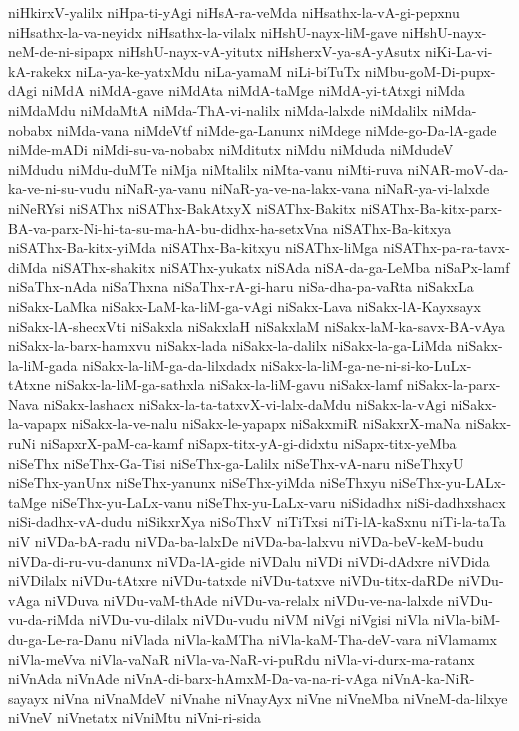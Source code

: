 {niHkirxV-yalilx
niHpa-ti-yAgi
niHsA-ra-veMda
niHsathx-la-vA-gi-pepxnu
niHsathx-la-va-neyidx
niHsathx-la-vilalx
niHshU-nayx-liM-gave
niHshU-nayx-neM-de-ni-sipapx
niHshU-nayx-vA-yitutx
niHsherxV-ya-sA-yAsutx
niKi-La-vi-kA-rakekx
niLa-ya-ke-yatxMdu
niLa-yamaM
niLi-biTuTx
niMbu-goM-Di-pupx-dAgi
niMdA
niMdA-gave
niMdAta
niMdA-taMge
niMdA-yi-tAtxgi
niMda
niMdaMdu
niMdaMtA
niMda-ThA-vi-nalilx
niMda-lalxde
niMdalilx
niMda-nobabx
niMda-vana
niMdeVtf
niMde-ga-Lanunx
niMdege
niMde-go-Da-lA-gade
niMde-mADi
niMdi-su-va-nobabx
niMditutx
niMdu
niMduda
niMdudeV
niMdudu
niMdu-duMTe
niMja
niMtalilx
niMta-vanu
niMti-ruva
niNAR-moV-da-ka-ve-ni-su-vudu
niNaR-ya-vanu
niNaR-ya-ve-na-lakx-vana
niNaR-ya-vi-lalxde
niNeRYsi
niSAThx
niSAThx-BakAtxyX
niSAThx-Bakitx
niSAThx-Ba-kitx-parx-BA-va-parx-Ni-hi-ta-su-ma-hA-bu-didhx-ha-setxVna
niSAThx-Ba-kitxya
niSAThx-Ba-kitx-yiMda
niSAThx-Ba-kitxyu
niSAThx-liMga
niSAThx-pa-ra-tavx-diMda
niSAThx-shakitx
niSAThx-yukatx
niSAda
niSA-da-ga-LeMba
niSaPx-lamf
niSaThx-nAda
niSaThxna
niSaThx-rA-gi-haru
niSa-dha-pa-vaRta
niSakxLa
niSakx-LaMka
niSakx-LaM-ka-liM-ga-vAgi
niSakx-Lava
niSakx-lA-Kayxsayx
niSakx-lA-shecxVti
niSakxla
niSakxlaH
niSakxlaM
niSakx-laM-ka-savx-BA-vAya
niSakx-la-barx-hamxvu
niSakx-lada
niSakx-la-dalilx
niSakx-la-ga-LiMda
niSakx-la-liM-gada
niSakx-la-liM-ga-da-lilxdadx
niSakx-la-liM-ga-ne-ni-si-ko-LuLx-tAtxne
niSakx-la-liM-ga-sathxla
niSakx-la-liM-gavu
niSakx-lamf
niSakx-la-parx-Nava
niSakx-lashacx
niSakx-la-ta-tatxvX-vi-lalx-daMdu
niSakx-la-vAgi
niSakx-la-vapapx
niSakx-la-ve-nalu
niSakx-le-yapapx
niSakxmiR
niSakxrX-maNa
niSakx-ruNi
niSapxrX-paM-ca-kamf
niSapx-titx-yA-gi-didxtu
niSapx-titx-yeMba
niSeThx
niSeThx-Ga-Tisi
niSeThx-ga-Lalilx
niSeThx-vA-naru
niSeThxyU
niSeThx-yanUnx
niSeThx-yanunx
niSeThx-yiMda
niSeThxyu
niSeThx-yu-LALx-taMge
niSeThx-yu-LaLx-vanu
niSeThx-yu-LaLx-varu
niSidadhx
niSi-dadhxshacx
niSi-dadhx-vA-dudu
niSikxrXya
niSoThxV
niTiTxsi
niTi-lA-kaSxnu
niTi-la-taTa
niV
niVDa-bA-radu
niVDa-ba-lalxDe
niVDa-ba-lalxvu
niVDa-beV-keM-budu
niVDa-di-ru-vu-danunx
niVDa-lA-gide
niVDalu
niVDi
niVDi-dAdxre
niVDida
niVDilalx
niVDu-tAtxre
niVDu-tatxde
niVDu-tatxve
niVDu-titx-daRDe
niVDu-vAga
niVDuva
niVDu-vaM-thAde
niVDu-va-relalx
niVDu-ve-na-lalxde
niVDu-vu-da-riMda
niVDu-vu-dilalx
niVDu-vudu
niVM
niVgi
niVgisi
niVla
niVla-biM-du-ga-Le-ra-Danu
niVlada
niVla-kaMTha
niVla-kaM-Tha-deV-vara
niVlamamx
niVla-meVva
niVla-vaNaR
niVla-va-NaR-vi-puRdu
niVla-vi-durx-ma-ratanx
niVnAda
niVnAde
niVnA-di-barx-hAmxM-Da-va-na-ri-vAga
niVnA-ka-NiR-sayayx
niVna
niVnaMdeV
niVnahe
niVnayAyx
niVne
niVneMba
niVneM-da-lilxye
niVneV
niVnetatx
niVniMtu
niVni-ri-sida
}
